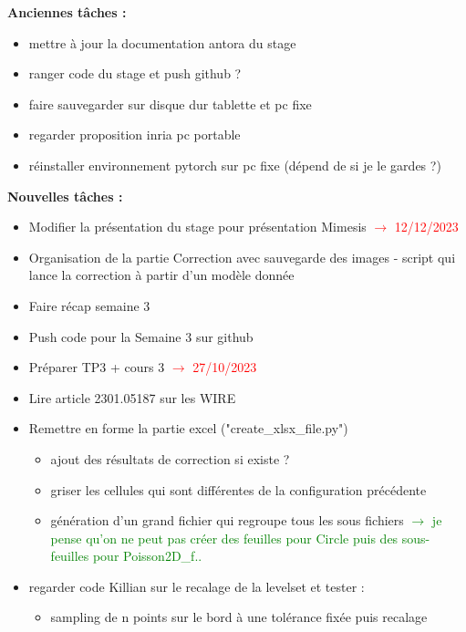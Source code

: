
\textbf{Anciennes tâches :}

\begin{itemize}[label=$\square$]
	\item mettre à jour la documentation antora du stage
	\item ranger code du stage et push github ?
	\item faire sauvegarder sur disque dur tablette et pc fixe
	\item regarder proposition inria pc portable
	\item réinstaller environnement pytorch sur pc fixe (dépend de si je le gardes ?)
\end{itemize}

\textbf{Nouvelles tâches :}

\begin{itemize}[label=$\square$]
	\item Modifier la présentation du stage pour présentation Mimesis \textcolor{red}{$\rightarrow$ 12/12/2023}
	\item[\done] Organisation de la partie Correction avec sauvegarde des images - script qui lance la correction à partir d'un modèle donnée
	\item[\done] Faire récap semaine 3
	\item[\done] Push code pour la Semaine 3 sur github
	\item[\done] Préparer TP3 + cours 3 \textcolor{red}{$\rightarrow$ 27/10/2023}
	\item Lire article 2301.05187 sur les WIRE
	\item[\done] Remettre en forme la partie excel ("create\_xlsx\_file.py")
	\begin{itemize}[label=\LARGE $\circ$]
		\item[\sdone] ajout des résultats de correction si existe ?
		\item[\sdone] griser les cellules qui sont différentes de la configuration précédente
		\item[\swontfix] génération d'un grand fichier qui regroupe tous les sous fichiers \textcolor{Green}{$\rightarrow$ je pense qu'on ne peut pas créer des feuilles pour Circle puis des sous-feuilles pour Poisson2D\_f..}		
	\end{itemize}
	\item regarder code Killian sur le recalage de la levelset et tester :
	\begin{itemize}[label=\LARGE $\circ$]
		\item sampling de n points sur le bord à une tolérance fixée puis recalage

\end{itemize}
\end{itemize}

